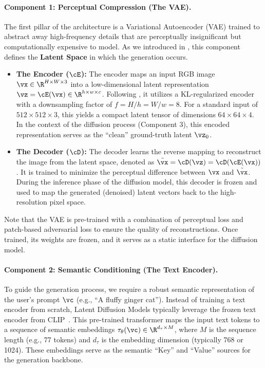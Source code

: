 \documentclass[../../book-main.tex]{subfiles}
\begin{document}
\paragraph{Component 1: Perceptual Compression (The VAE).}
The first pillar of the architecture is a Variational Autoencoder (VAE) trained to abstract away high-frequency details that are perceptually insignificant but computationally expensive to model.
As we introduced in , this component defines the \textbf{Latent Space} in which the generation occurs.
\begin{itemize}
    \item \textbf{The Encoder (\(\cE\)):} The encoder maps an input RGB image \(\vx \in \R^{H \times W \times 3}\) into a low-dimensional latent representation \(\vz = \cE(\vx) \in \R^{h \times w \times c}\).
Following \citet{rombach2022high}, it utilizes a KL-regularized encoder with a downsampling factor of \(f = H/h = W/w = 8\).
For a standard input of \(512 \times 512 \times 3\), this yields a compact latent tensor of dimensions \(64 \times 64 \times 4\).
In the context of the diffusion process (Component 3), this encoded representation serves as the ``clean'' ground-truth latent \(\vz_{0}\).
    \item \textbf{The Decoder (\(\cD\)):} The decoder learns the reverse mapping to reconstruct the image from the latent space, denoted as \(\tilde{\vx} = \cD(\vz) = \cD(\cE(\vx))\).
It is trained to minimize the perceptual difference between \(\vx\) and \(\tilde{\vx}\).
During the inference phase of the diffusion model, this decoder is frozen and used to map the generated (denoised) latent vectors back to the high-resolution pixel space.
\end{itemize}
Note that the VAE is pre-trained with a combination of perceptual loss and patch-based adversarial loss to ensure the quality of reconstructions.
Once trained, its weights are frozen, and it serves as a static interface for the diffusion model.

\paragraph{Component 2: Semantic Conditioning (The Text Encoder).}
To guide the generation process, we require a robust semantic representation of the user's prompt \(\vc\) (e.g., ``A fluffy ginger cat'').
Instead of training a text encoder from scratch, Latent Diffusion Models typically leverage the frozen text encoder from CLIP~\citep{radford2021learning}.
This pre-trained transformer maps the input text tokens to a sequence of semantic embeddings \(\tau_{\theta}(\vc) \in \R^{d_{\tau} \times M}\), where \(M\) is the sequence length (e.g., 77 tokens) and \(d_{\tau}\) is the embedding dimension (typically 768 or 1024).
These embeddings serve as the semantic ``Key'' and ``Value'' sources for the generation backbone.
\end{document}
